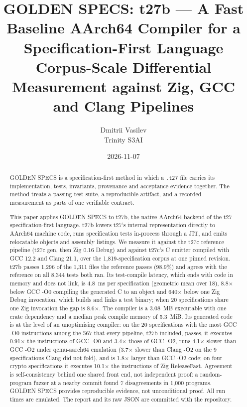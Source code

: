 \documentclass[11pt,a4paper]{article}
\title{GOLDEN SPECS: t27b --- A Fast Baseline AArch64 Compiler for a Specification-First Language\\[2pt]
\large Corpus-Scale Differential Measurement against Zig, GCC and Clang Pipelines}
\author{Dmitrii Vasilev\\ \small Trinity S3AI}
\date{2026-11-07}
\begin{document}
\maketitle

\begin{abstract}
GOLDEN SPECS is a specification-first method in which a \texttt{.t27} file carries its implementation, tests, invariants, provenance and acceptance evidence together. The method treats a passing test suite, a reproducible artifact, and a recorded measurement as parts of one verifiable contract.

This paper applies GOLDEN SPECS to t27b, the native AArch64 backend of the t27 specification-first language. t27b lowers t27's internal representation directly to AArch64 machine code, runs specification tests in-process through a JIT, and emits relocatable objects and assembly listings. We measure it against the t27c reference pipeline (t27c gen, then Zig 0.16 Debug) and against t27c's C emitter compiled with GCC 12.2 and Clang 21.1, over the 1,819-specification corpus at one pinned revision. t27b passes 1,296 of the 1,311 files the reference passes (98.9\%) and agrees with the reference on all 8,344 tests both ran. Its test-compile latency, which ends with code in memory and does not link, is 4.8~ms per specification (geometric mean over 18), 8.8$\times$ below GCC -O0 compiling the generated C to an object and 640$\times$ below one Zig Debug invocation, which builds and links a test binary; when 20 specifications share one Zig invocation the gap is 8.6$\times$. The compiler is a 3.08~MB executable with one crate dependency and a median peak compile memory of 5.3~MiB. Its generated code is at the level of an unoptimising compiler: on the 20 specifications with the most GCC -O0 instructions among the 567 that every pipeline, t27b included, passes, it executes 0.91$\times$ the instructions of GCC -O0 and 3.4$\times$ those of GCC -O2, runs 4.1$\times$ slower than GCC -O2 under qemu-aarch64 emulation (3.7$\times$ slower than Clang -O2 on the 9 specifications Clang did not fold), and is 1.8$\times$ larger than GCC -O2 code; on four crypto specifications it executes 10.1$\times$ the instructions of Zig ReleaseFast. Agreement is self-consistency behind one shared front end, not independent proof: a random-program fuzzer at a nearby commit found 7 disagreements in 1,000 programs. GOLDEN SPECS provides reproducible evidence, not unconditional proof. All run times are emulated. The report and its raw JSON are committed with the repository.
\end{abstract}
\end{document}

